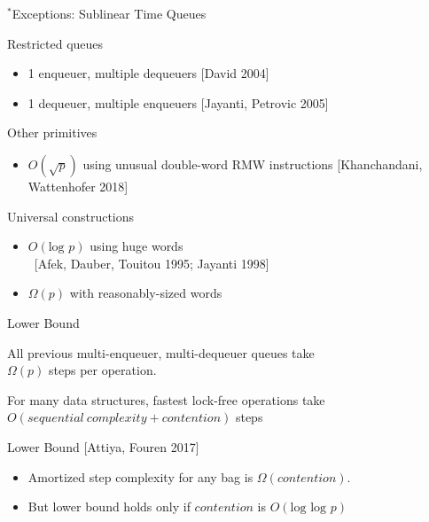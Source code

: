 \documentclass[compress]{beamer}
\renewcommand{\log}{\mbox{log }} %
\begin{document}
\begin{frame}{$^*$Exceptions: Sublinear Time Queues}

\begin{block}{Restricted queues}
\begin{itemize}
\item
1 enqueuer, multiple dequeuers \hfill {\small [David 2004]}
\item
1 dequeuer, multiple enqueuers \hfill {\small [Jayanti, Petrovic 2005]}
\end{itemize}
\end{block}

\pause 

\begin{block}{Other primitives}
\begin{itemize}
\item
$O(\sqrt{p})$ using unusual double-word RMW instructions
 \hfill {\small [Khanchandani, Wattenhofer 2018]}
\end{itemize}
\end{block}

\pause

\begin{block}{Universal constructions}
\begin{itemize}
\item
$O(\log p)$ using huge words\\
\mbox{ }\hfill{\small [Afek, Dauber, Touitou 1995; Jayanti 1998]}
\item
$\Omega(p)$ with reasonably-sized words
\end{itemize}
\end{block}
\end{frame}

\begin{frame}{Lower Bound}

All previous multi-enqueuer, multi-dequeuer queues take\\
$\Omega(p)$ steps per operation.

\medskip

For many  data structures, fastest lock-free operations take
$O(sequential\ complexity + contention)$ steps

\pause

\begin{block}{Lower Bound \hfill {\small [Attiya, Fouren 2017]}}
\begin{itemize}
\item
Amortized step complexity for any bag is $\Omega(contention)$.
\pause
\item
But lower bound holds only if $contention$ is $O(\log\log p)$
\end{itemize}
\end{block}

\end{frame}
\end{document}

